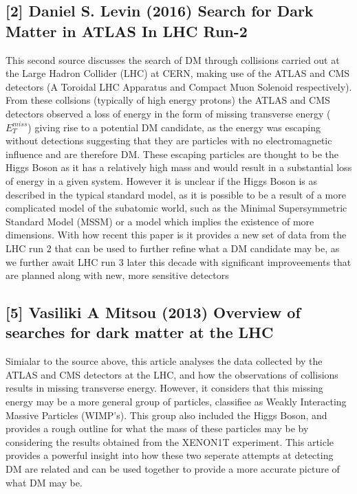 \documentclass[]{article}
\begin{document}
\subsection*{[2] Daniel S. Levin (2016) Search for Dark Matter in ATLAS In LHC Run-2}
\parskip 0.2cm
This second source discusses the search of DM through collisions carried out at the Large 
Hadron Collider (LHC) at CERN, making use of the ATLAS and CMS detectors 
(A Toroidal LHC Apparatus and Compact Muon Solenoid respectively).
From these collsions (typically of high energy protons) the ATLAS and CMS detectors
observed a loss of energy in the form of missing transverse energy ($E^{miss}_{T} $)
giving rise to a potential DM candidate, as the energy was escaping without 
detections suggesting that they are particles with no electromagnetic influence 
and are therefore DM. These escaping particles are thought to be the Higgs Boson 
as it has a relatively high mass and would result in a substantial loss of energy
in a given system. However it is unclear if the Higgs Boson is as 
described in the typical standard model, as it is possible to be a result of a more 
complicated model of the subatomic world, such as the Minimal Supersymmetric Standard Model (MSSM)
or a model which implies the existence of more dimensions. With how recent this paper 
is it provides a new set of data from the LHC run 2 that can be used to further refine 
what a DM candidate may be, as we further await LHC run 3 later this decade with 
significant improveements that are planned along with new, more sensitive detectors\parskip 0.2cm 

\noindent 
\subsection*{[5] Vasiliki A Mitsou (2013) Overview of searches for dark matter at the LHC}
\parskip 0.2cm
Simialar to the source above, this article analyses the data collected by the
ATLAS and CMS detectors at the LHC, and how the observations of collisions results in
missing transverse energy. However, it considers that this missing energy may be
a more general group of particles, classifiee as Weakly Interacting Massive Particles (WIMP's).
This group also included the Higgs Boson, and provides a rough outline for what 
the mass of these particles may be by considering the results obtained 
from the XENON1T experiment. This article provides a powerful insight into how these
two seperate attempts at detecting DM are related and can be used together 
to provide a more accurate picture of what DM may be.
\end{document}
